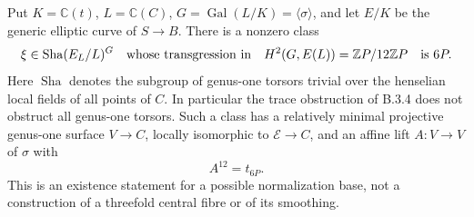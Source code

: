 \begin{proposition}\label{push:B36}
Put $K=\mathbb C(t)$, $L=\mathbb C(C)$,
$G=\operatorname{Gal}(L/K)=\langle\sigma\rangle$,
and let $E/K$ be the generic elliptic
curve of $S\to B$. There is a nonzero
class
\[
 \xi\in\operatorname{Sha}(E_L/L)^G
 \quad\hbox{whose transgression in}\quad
 H^2(G,E(L))=\mathbb ZP/12\mathbb ZP
 \quad\hbox{is }6P.
\]
Here $\operatorname{Sha}$ denotes the
subgroup of genus-one torsors trivial
over the henselian local fields of all
points of $C$.
In particular the trace obstruction of
B.3.4 does not obstruct all genus-one
torsors. Such a class has a relatively
minimal projective genus-one surface
$V\to C$, locally isomorphic to
$\mathscr E\to C$, and an affine lift
$A:V\to V$ of $\sigma$ with
\[
 A^{12}=t_{6P}.
\]
This is an existence statement for a
possible normalization base, not a
construction of a threefold central
fibre or of its smoothing.
\end{proposition}
